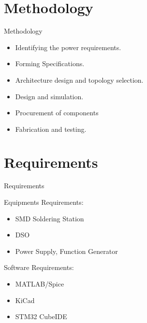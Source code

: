 \documentclass[aspectratio=169]{beamer}
\begin{document}
\section{Methodology}

	
	
	
	

\begin{frame}{Methodology}
		\begin{itemize}
			
			\item Identifying the power requirements.
			\item Forming Specifications.
			\item Architecture design and topology selection.
			\item Design and simulation.
			\item Procurement of components
			\item Fabrication and testing.
			
		\end{itemize} 
	
\end{frame}


\section{Requirements}
\begin{frame}{Requirements}
	\begin{minipage}{0.5\textwidth}
		Equipments Requirements:
		\begin{itemize}
			
			\item SMD Soldering Station
			\item DSO
			\item Power Supply, Function Generator
		\end{itemize} 
	\end{minipage}
	\begin{minipage}{0.3\textwidth}
		Software Requirements:
		\begin{itemize}
			
			\item MATLAB/Spice
			\item KiCad
			\item STM32 CubeIDE
			
		\end{itemize} 
		
	\end{minipage}
\end{frame}
\end{document}
